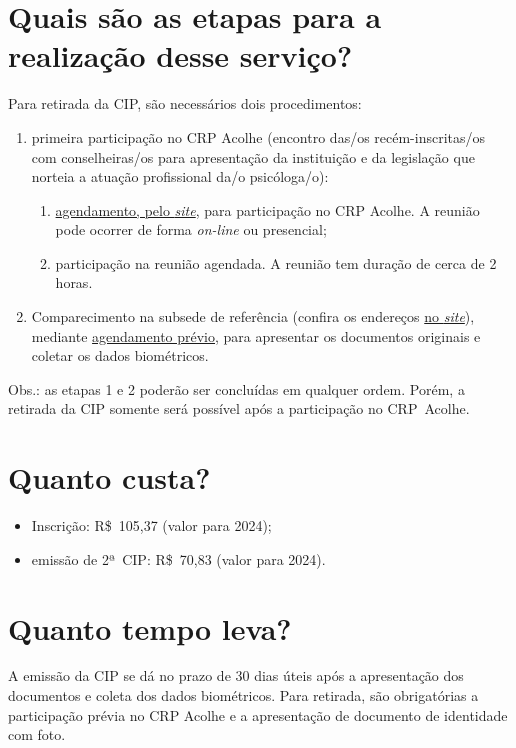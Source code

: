 \section{Quais são as etapas para a realização desse serviço?}

Para retirada da CIP, são necessários dois procedimentos:

\begin{enumerate}
\item
  primeira participação no CRP Acolhe (encontro das/os   recém-inscritas/os com conselheiras/os para apresentação da  instituição e da legislação que norteia a atuação profissional da/o psicóloga/o):

  \begin{enumerate}
    \item
    \href{https://www.crpsp.org/inscrito/login}{agendamento, pelo \emph{site}}, para participação no CRP Acolhe. A reunião pode
    ocorrer de forma \emph{on-line} ou presencial;
  \item
    participação na reunião agendada. A reunião tem duração de cerca de 2 horas.
  \end{enumerate}
\item
  Comparecimento na subsede de referência (confira os endereços \href{https://www.crpsp.org/sede/index}{no \emph{site}}), mediante
  \href{https://www.crpsp.org/agendamento}{agendamento prévio}, para apresentar os documentos originais e coletar os dados
  biométricos.
\end{enumerate}

\noindent Obs.: as etapas 1 e 2 poderão ser concluídas em qualquer ordem. Porém, a retirada da CIP somente será possível após a participação no CRP~Acolhe.

\section{Quanto custa?}

\begin{itemize}
\item
  Inscrição: R\$~105,37 (valor para 2024);
\item
  emissão de 2ª~CIP: R\$~70,83 (valor para 2024).
\end{itemize}

\section{Quanto tempo leva?}

A emissão da CIP se dá no prazo de 30 dias úteis após a apresentação dos documentos e coleta dos dados biométricos. Para retirada, são obrigatórias a participação prévia no CRP Acolhe e a apresentação de documento de identidade com foto.

